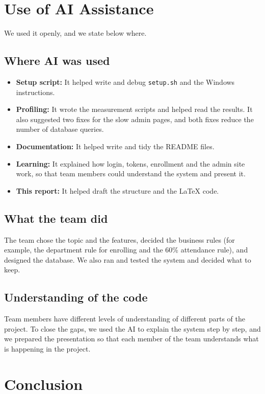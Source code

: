 \documentclass[11pt,a4paper]{article}
\begin{document}
\section{Use of AI Assistance}

We used it openly, and we state below where.

\subsection{Where AI was used}
\begin{itemize}
  \item \textbf{Setup script:} It helped write and debug \texttt{setup.sh} and the
        Windows instructions.
  \item \textbf{Profiling:} It wrote the measurement scripts and helped read the
        results. It also suggested two fixes for the slow admin pages, and both
        fixes reduce the number of database queries.
  \item \textbf{Documentation:} It helped write and tidy the README files.
  \item \textbf{Learning:} It explained how login, tokens, enrollment and the admin
        site work, so that team members could understand the system and present it.
  \item \textbf{This report:} It helped draft the structure and the \LaTeX{} code.
\end{itemize}

\subsection{What the team did}
The team chose the topic and the features, decided the business rules (for example,
the department rule for enrolling and the 60\% attendance rule), and designed the
database. We also ran and tested the system and decided what to keep.

\subsection{Understanding of the code}
Team members have different levels of understanding of different parts of the
project. To close the gaps, we used the AI to explain the system step by step, and
we prepared the presentation so that each member of the team understands what is happening in the project.

\section{Conclusion}
\end{document}
